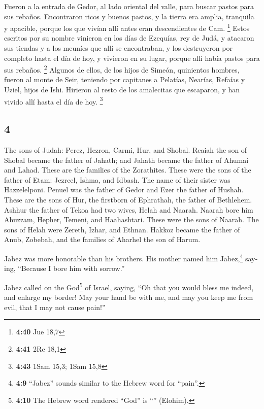 \begin{paracol}{2}
 Fueron a la entrada de Gedor, al lado oriental del
valle, para buscar pastos para sus rebaños.  Encontraron
ricos y buenos pastos, y la tierra era amplia, tranquila y apacible,
porque los que vivían allí antes eran descendientes de Cam. \footnote{\textbf{4:40}
  Jue 18,7}  Estos escritos por su nombre vinieron en los
días de Ezequías, rey de Judá, y atacaron sus tiendas y a los meuníes
que allí se encontraban, y los destruyeron por completo hasta el día de
hoy, y vivieron en su lugar, porque allí había pastos para sus rebaños.
\footnote{\textbf{4:41} 2Re 18,1}  Algunos de ellos, de
los hijos de Simeón, quinientos hombres, fueron al monte de Seir,
teniendo por capitanes a Pelatías, Nearías, Refaías y Uziel, hijos de
Ishi.  Hirieron al resto de los amalecitas que escaparon,
y han vivido allí hasta el día de hoy. \footnote{\textbf{4:43} 1Sam
  15,3; 1Sam 15,8}

\switchcolumn
\begin{otherlanguage}{english}

\hypertarget{section-7}{%
\section{4}\label{section-7}}

 The sons of Judah: Perez, Hezron, Carmi, Hur, and Shobal.
 Reaiah the son of Shobal became the father of Jahath; and
Jahath became the father of Ahumai and Lahad. These are the families of
the Zorathites.  These were the sons of the father of
Etam: Jezreel, Ishma, and Idbash. The name of their sister was
Hazzelelponi.  Penuel was the father of Gedor and Ezer the
father of Hushah. These are the sons of Hur, the firstborn of Ephrathah,
the father of Bethlehem.  Ashhur the father of Tekoa had
two wives, Helah and Naarah.  Naarah bore him Ahuzzam,
Hepher, Temeni, and Haahashtari. These were the sons of Naarah.
 The sons of Helah were Zereth, Izhar, and Ethnan.
 Hakkoz became the father of Anub, Zobebah, and the
families of Aharhel the son of Harum.

 Jabez was more honorable than his brothers. His mother
named him Jabez,\footnote{\textbf{4:9} ``Jabez'' sounds similar to the
  Hebrew word for ``pain''.} saying, ``Because I bore him with sorrow.''

 Jabez called on the God\footnote{\textbf{4:10} The
  Hebrew word rendered ``God'' is ``'' (Elohim).} of
Israel, saying, ``Oh that you would bless me indeed, and enlarge my
border! May your hand be with me, and may you keep me from evil, that I
may not cause pain!''


\end{otherlanguage}
\end{paracol}
